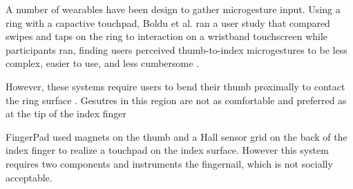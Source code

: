 \documentclass [11pt, proquest] {uwthesis}[2020/02/24]
\begin{document}
A number of wearables have been design to gather microgesture input. Using a ring with a capactive touchpad, Boldu et al. ran a user study that compared swipes and taps on the ring to interaction on a wristband touchscreen while participants ran, finding users perceived thumb-to-index microgestures to be less complex, easier to use, and less cumbersome \cite{BolduThumbInMotion}. 

However, these systems require users to bend their thumb proximally to contact the ring surface . Gesutres in this region are not as comfortable and preferred as at the tip of the index finger \cite{huang2016digitspace}

FingerPad used magnets on the thumb and a Hall sensor grid on the back of the index finger to realize a touchpad on the index surface. However this system requires two components and instruments the fingernail, which is not socially acceptable. 


\end{document}
